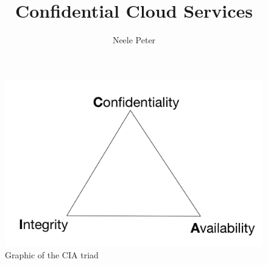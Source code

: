 \documentclass[sigconf]{acmart}
\title{Confidential Cloud Services}
\author{Neele Peter}
\affiliation{%
  \institution{Friedrich-Alexander-Universit\"at Erlangen-N\"urnberg}}
\begin{document}
	
	
\maketitle



	
	
\begin{figure}[h]
	\includegraphics[scale=0.25]{pictures/cia_triad}
	\caption{Graphic of the CIA triad}
\end{figure}

	
\newpage



\newpage	



\newpage



\newpage



\newpage


	
\end{document}
